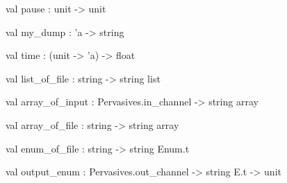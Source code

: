 \documentclass[11pt]{article}
\begin{document}
\label{val:Util.pause}\begin{ocamldoccode}
val pause : unit -> unit
\end{ocamldoccode}




\label{val:Util.my-underscoredump}\begin{ocamldoccode}
val my_dump : 'a -> string
\end{ocamldoccode}




\label{val:Util.time}\begin{ocamldoccode}
val time : (unit -> 'a) -> float
\end{ocamldoccode}




\label{val:Util.list-underscoreof-underscorefile}\begin{ocamldoccode}
val list_of_file : string -> string list
\end{ocamldoccode}




\label{val:Util.array-underscoreof-underscoreinput}\begin{ocamldoccode}
val array_of_input : Pervasives.in_channel -> string array
\end{ocamldoccode}




\label{val:Util.array-underscoreof-underscorefile}\begin{ocamldoccode}
val array_of_file : string -> string array
\end{ocamldoccode}




\label{val:Util.enum-underscoreof-underscorefile}\begin{ocamldoccode}
val enum_of_file : string -> string Enum.t
\end{ocamldoccode}




\label{val:Util.output-underscoreenum}\begin{ocamldoccode}
val output_enum : Pervasives.out_channel -> string E.t -> unit
\end{ocamldoccode}
\end{document}

